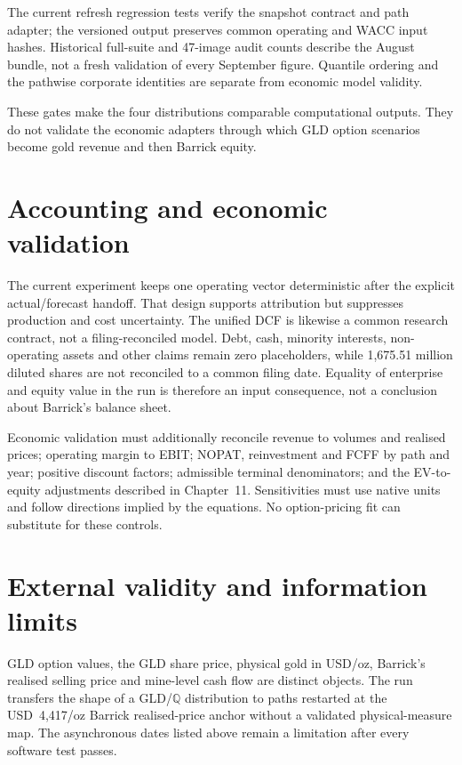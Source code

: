 The current refresh regression tests verify the snapshot contract and path
adapter; the versioned output preserves common operating and WACC input hashes.
Historical full-suite and 47-image audit counts describe the August bundle,
not a fresh validation of every September figure. Quantile ordering and the
pathwise corporate identities are separate from economic model validity.

These gates make the four distributions comparable computational outputs.
They do not validate the economic adapters through which GLD option scenarios
become gold revenue and then Barrick equity.

\section{Accounting and economic validation}

The current experiment keeps one operating vector deterministic after the
explicit actual/forecast handoff. That design supports attribution but
suppresses production and cost uncertainty. The unified DCF is likewise a common research contract, not a
filing-reconciled model. Debt, cash, minority interests, non-operating assets
and other claims remain zero placeholders, while 1,675.51 million diluted
shares are not reconciled to a common filing date. Equality of enterprise and
equity value in the run is therefore an input consequence, not a conclusion
about Barrick's balance sheet.

Economic validation must additionally reconcile revenue to volumes and
realised prices; operating margin to EBIT; NOPAT, reinvestment and FCFF by path
and year; positive discount factors; admissible terminal denominators; and the
EV-to-equity adjustments described in Chapter~11. Sensitivities must use native
units and follow directions implied by the equations. No option-pricing fit can
substitute for these controls.

\section{External validity and information limits}

GLD option values, the GLD share price, physical gold in USD/oz, Barrick's
realised selling price and mine-level cash flow are distinct objects. The run
transfers the shape of a GLD/\(\mathbb Q\) distribution to paths restarted at
the USD~4,417/oz Barrick realised-price anchor without a validated
physical-measure map. The
asynchronous dates listed above remain a limitation after every software test
passes.

